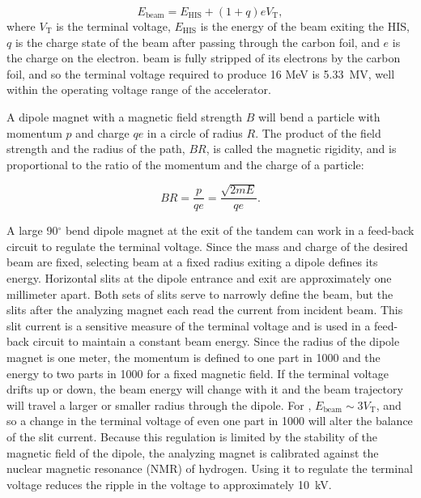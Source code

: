 \begin{equation}
E_{\text{beam}} = E_{\text{HIS}} + (1+q)eV_{\text{T}},
\label{eqn:beamEnergy}
\end{equation}
where $V_{\text{T}}$ is the terminal voltage, $E_{\text{HIS}}$ is the energy of the beam exiting the HIS, $q$ is the charge state of the beam after passing through the carbon foil, and $e$ is the charge on the electron.   beam is fully stripped of its electrons by the carbon foil, and so the terminal voltage required to produce 16 MeV  is 5.33~MV, well within the operating voltage range of the accelerator.    

A dipole magnet with a magnetic field strength $B$ will bend a particle with momentum $p$ and charge $qe$ in a circle of radius $R$.  The product of the field strength and the radius of the path, $BR$, is called the magnetic rigidity, and is proportional to the ratio of the momentum and the charge of a particle:

\begin{equation}
BR = \frac{p}{qe} = \frac{\sqrt{2mE}}{qe}.
\label{eqn:rigidity}
\end{equation}

A large 90$^{\circ}$ bend dipole magnet at the exit of the tandem can work in a feed-back circuit to regulate the terminal voltage.  Since the mass and charge of the desired beam are fixed, selecting beam at a fixed radius exiting a dipole defines its energy.  Horizontal slits at the dipole entrance and exit are approximately one millimeter apart.  Both sets of slits serve to narrowly define the beam, but the slits after the analyzing magnet each read the current from incident beam.  This slit current is a sensitive measure of the terminal voltage and is used in a feed-back circuit to maintain a constant beam energy.  Since the radius of the dipole magnet is one meter, the momentum is defined to one part in 1000 and the energy to two parts in 1000 for a fixed magnetic field.  If the terminal voltage drifts up or down, the beam energy will change with it and the beam trajectory will travel a larger or smaller radius through the dipole.  For , $E_{\text{beam}}\sim3V_{\text{T}}$, and so a change in the terminal voltage of even one part in 1000 will alter the balance of the slit current.  Because this regulation is limited by the stability of the magnetic field of the dipole, the analyzing magnet is calibrated against the nuclear magnetic resonance (NMR) of hydrogen.  Using it to regulate the terminal voltage reduces the ripple in the voltage to approximately 10~kV.


